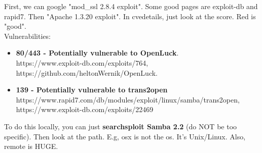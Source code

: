\documentclass[11pt,a4paper]{article}
\begin{document}
First, we can google "mod\_ssl 2.8.4 exploit". Some good pages are exploit-db and rapid7. Then "Apache 1.3.20 exploit". In cvedetails, just look at the score. Red is "good".\\

\newpage
Vulnerabilities:
\begin{itemize}
\item \textbf{80/443 - Potentially vulnerable to OpenLuck}. \\https://www.exploit-db.com/exploits/764,\\https://github.com/heltonWernik/OpenLuck.
\item \textbf{139 - Potentially vulnerable to trans2open}\\ https://www.rapid7.com/db/modules/exploit/linux/samba/trans2open, \\https://www.exploit-db.com/exploits/22469
\end{itemize}

\noindent \dotfill

To do this locally, you can just \textbf{searchsploit Samba 2.2} (do NOT be too specific). Then look at the path. E.g, osx is not the os. It's Unix/Linux. Also, remote is HUGE.
\end{document}
